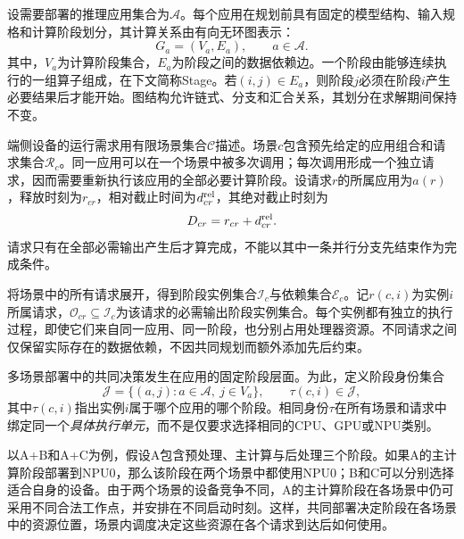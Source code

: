 设需要部署的推理应用集合为$\mathcal A$。每个应用在规划前具有固定的模型结构、输入规格和计算阶段划分，其计算关系由有向无环图表示：
\begin{equation}
 G_a=(V_a,E_a),\qquad a\in\mathcal A.
 \label{eq:c3-app}
\end{equation}
其中，$V_a$为计算阶段集合，$E_a$为阶段之间的数据依赖边。一个阶段由能够连续执行的一组算子组成，在下文简称Stage。若$(i,j)\in E_a$，则阶段$j$必须在阶段$i$产生必要结果后才能开始。图结构允许链式、分支和汇合关系，其划分在求解期间保持不变。

端侧设备的运行需求用有限场景集合$\mathcal C$描述。场景$c$包含预先给定的应用组合和请求集合$\mathcal R_c$。同一应用可以在一个场景中被多次调用；每次调用形成一个独立请求，因而需要重新执行该应用的全部必要计算阶段。设请求$r$的所属应用为$a(r)$，释放时刻为$r_{cr}$，相对截止时间为$d^{\rm rel}_{cr}$，其绝对截止时刻为
\begin{equation}
 D_{cr}=r_{cr}+d^{\rm rel}_{cr}.
 \label{eq:c3-deadline}
\end{equation}
请求只有在全部必需输出产生后才算完成，不能以其中一条并行分支先结束作为完成条件。

将场景中的所有请求展开，得到阶段实例集合$\mathcal I_c$与依赖集合$\mathcal E_c$。记$r(c,i)$为实例$i$所属请求，$\mathcal O_{cr}\subseteq\mathcal I_c$为该请求的必需输出阶段实例集合。每个实例都有独立的执行过程，即使它们来自同一应用、同一阶段，也分别占用处理器资源。不同请求之间仅保留实际存在的数据依赖，不因共同规划而额外添加先后约束。

多场景部署中的共同决策发生在应用的固定阶段层面。为此，定义阶段身份集合
\begin{equation}
 \mathcal J=\{(a,j):a\in\mathcal A,\ j\in V_a\},\qquad
 \tau(c,i)\in\mathcal J,
 \label{eq:c3-stage-id}
\end{equation}
其中$\tau(c,i)$指出实例$i$属于哪个应用的哪个阶段。相同身份$\tau$在所有场景和请求中绑定同一个\emph{具体执行单元}，而不是仅要求选择相同的CPU、GPU或NPU类别。

以A+B和A+C为例，假设A包含预处理、主计算与后处理三个阶段。如果A的主计算阶段部署到NPU0，那么该阶段在两个场景中都使用NPU0；B和C可以分别选择适合自身的设备。由于两个场景的设备竞争不同，A的主计算阶段在各场景中仍可采用不同合法工作点，并安排在不同启动时刻。这样，共同部署决定阶段在各场景中的资源位置，场景内调度决定这些资源在各个请求到达后如何使用。



